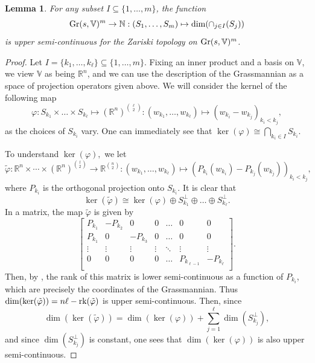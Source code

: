 \documentclass{article}
\newtheorem{lemma}[theorem]{Lemma}
\theoremstyle{definition}
\theoremstyle{remark}
\begin{document}
\begin{lemma}\label{lem: Intersections_of_subspaces}
    For any subset $I\subseteq \{1, \dots, m\}$, the function 
    \begin{equation*}
    \textup{Gr}(s, \mathbb{V})^{m} \rightarrow \mathbb{N}: (S_1, \dots, S_m) \mapsto \dim(\cap_{ j \in I}(S_j))
    \end{equation*}
    is upper semi-continuous for the Zariski topology on $\textup{Gr}(s, \mathbb{V})^{m} $.
\end{lemma}
\begin{proof}
Let $I = \{ k_1, \dots, k_\ell\} \subseteq \{1, \dots, m\}$. Fixing an inner product and a basis on $\mathbb{V}$, we view $\mathbb{V}$ as being $\mathbb{R}^{n}$, and we can use the description of the Grassmannian as a space of projection operators given above. We will consider the kernel of the following map
\begin{equation*}
    \varphi: S_{k_1} \times \dots \times S_{k_\ell} \mapsto (\mathbb{R}^{n})^{\binom{\ell}{2}} : \left(w_{k_1}, \dots, w_{k_\ell}\right) \mapsto (w_{k_{i}} - w_{k_j})_{k_i < k_j},
\end{equation*}
as the choices of $S_{k_i}$ vary. One can immediately see that $\ker(\varphi)\cong \bigcap_{k_i \in I} S_{k_i}$.

To understand $\ker(\varphi),$ we let $\tilde{\varphi}: \mathbb{R}^{n} \times \cdots \times  (\mathbb{R}^{n})^{\binom{l}{2}} \rightarrow \mathbb{R}^{\binom{n}{2}}: (w_{k_1}, \dots, w_{k_\ell}) \mapsto \left(P_{k_i}(w_{k_i}) -  P_{k_j}(w_{k_j})\right)_{k_i < k_j},$ where $P_{k_i}$ is the orthogonal projection onto $S_{k_i}$. It is clear that
\begin{equation*}
    \ker(\tilde{\varphi}) \cong \ker(\varphi) \oplus S_{k_1}^{\perp} \oplus  \dots \oplus  S_{k_\ell}^{\perp}.
\end{equation*}
    In a matrix, the map $\tilde{\varphi}$ is given by   \begin{equation*}
    \begin{bmatrix}
        P_{k_1} & -P_{k_2} & 0 & 0 & \dots & 0 &0 \\
        P_{k_1} & 0 & -P_{k_3} & 0 & \dots & 0 &0 \\
\vdots & \vdots&\vdots &\vdots & \ddots & \vdots&\vdots \\
        0 &  0 & 0 & 0 & \dots & P_{k_{\ell-1}} & -P_{k_{\ell}}\\
    \end{bmatrix}.
    \end{equation*}
    Then, by , the rank of this matrix is lower semi-continuous as a function of $P_{k_i}$, which are precisely the coordinates of the Grassmannian. Thus $\dim(\ker(\tilde{\varphi})) = n\ell - \textup{rk}(\tilde{\varphi})$ is upper semi-continuous. Then, since 
    \begin{equation*}
        \dim(\ker(\tilde{\varphi})) = \dim(\ker(\varphi)) + \sum_{j=1}^{\ell}  \dim(S_{k_j}^{\perp}),
    \end{equation*}
    and since $\dim(S_{k_j}^{\perp})$ is constant, one sees that $\dim(\ker(\varphi))$ is also upper semi-continuous. 
\end{proof}
\end{document}
